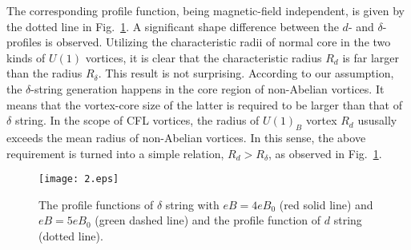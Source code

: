 \documentclass[12pt]{article}
\begin{document}
The corresponding profile function, being magnetic-field independent, is given by the dotted line in Fig.~\ref{fig:2}. A significant shape difference between the $d$- and $\delta$-profiles is observed.
Utilizing the characteristic radii of normal core in the two kinds of $U(1)$ vortices, it is clear that
the characteristic radius $R_d$ is far larger than the radius $R_\delta$.
This result is not surprising. According to our assumption, the $\delta$-string generation happens in
the core region of non-Abelian vortices. It means that the vortex-core size of the latter is required
to be larger than that of $\delta$ string. In the scope of CFL vortices, the radius of $U(1)_B$ vortex $R_d$ ususally exceeds the mean radius of non-Abelian vortices. In this sense, the
above requirement is turned into a simple relation, $R_d > R_\delta$, as observed in Fig.~\ref{fig:2}.

\begin{figure}
	\texttt{[image: 2.eps]}
	\caption{The profile functions of $\delta$ string with $eB = 4eB_0$ (red solid line) and
    $eB = 5 eB_0$ (green dashed line) and the profile function of $d$ string (dotted line).}
	\label{fig:2}
\end{figure}
\end{document}

